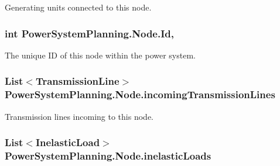 Generating units connected to this node. 

\subsubsection[{\texorpdfstring{Id}{Id}}]{\setlength{\rightskip}{0pt plus 5cm}int Power\+System\+Planning.\+Node.\+Id\hspace{0.3cm}{\ttfamily [get]}, {\ttfamily [set]}}\hypertarget{class_power_system_planning_1_1_node_abd72649e4b2b83daa0980ab87a90034a}{}\label{class_power_system_planning_1_1_node_abd72649e4b2b83daa0980ab87a90034a}


The unique ID of this node within the power system. 

\subsubsection[{\texorpdfstring{incoming\+Transmission\+Lines}{incomingTransmissionLines}}]{\setlength{\rightskip}{0pt plus 5cm}List$<${\bf Transmission\+Line}$>$ Power\+System\+Planning.\+Node.\+incoming\+Transmission\+Lines\hspace{0.3cm}{\ttfamily [get]}}\hypertarget{class_power_system_planning_1_1_node_a37a2e9e5e0ac761f6b85814764b41ef3}{}\label{class_power_system_planning_1_1_node_a37a2e9e5e0ac761f6b85814764b41ef3}


Transmission lines incoming to this node. 

\subsubsection[{\texorpdfstring{inelastic\+Loads}{inelasticLoads}}]{\setlength{\rightskip}{0pt plus 5cm}List$<${\bf Inelastic\+Load}$>$ Power\+System\+Planning.\+Node.\+inelastic\+Loads\hspace{0.3cm}{\ttfamily [get]}}\hypertarget{class_power_system_planning_1_1_node_a4cc33a77151060a8eb42d879017733da}{}\label{class_power_system_planning_1_1_node_a4cc33a77151060a8eb42d879017733da}


